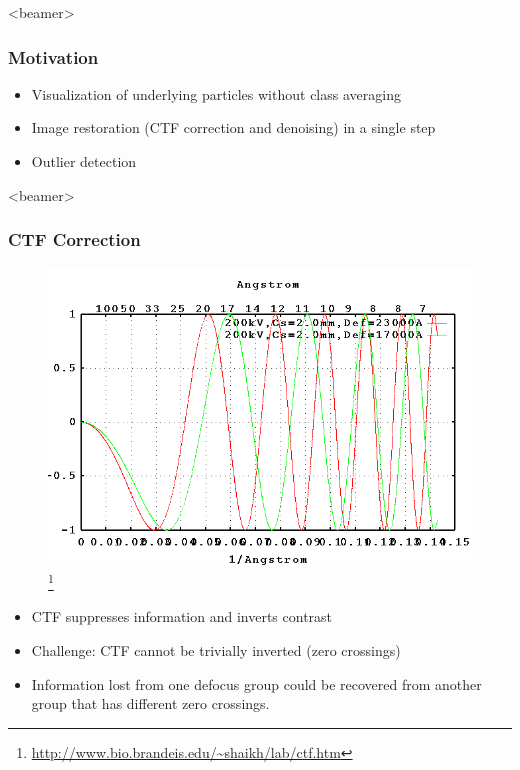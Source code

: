 \documentclass{beamer}
\begin{document}
\begin{frame}<beamer>
\frametitle{Motivation}
\begin{itemize}[<+->]
 \item Visualization of underlying particles \alert{without class averaging}
 \item Image restoration (CTF correction and denoising) in a \alert{single step}
  \item \alert{Outlier detection}
\end{itemize}
\end{frame}


\begin{frame}<beamer>
\frametitle{CTF Correction}
\begin{figure}[]
 \includegraphics[scale=0.4]{ctf2-ice.png}
 \footnote{\url{http://www.bio.brandeis.edu/~shaikh/lab/ctf.htm}}
\end{figure}


\begin{itemize}[<+->]
\item CTF suppresses information and inverts contrast
\item \alert{Challenge}: CTF cannot be trivially inverted (zero crossings)
\item Information lost from one defocus group could be recovered from another group that has different zero crossings.
\end{itemize}
\end{frame}
\end{document}
